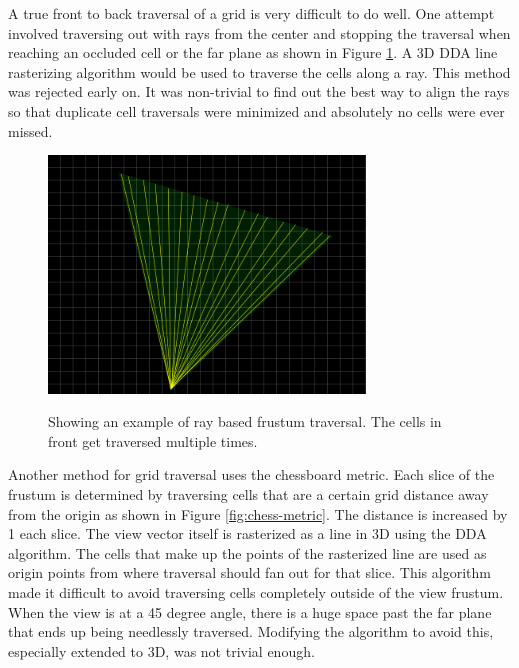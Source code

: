 \documentclass[12pt]{ucthesis}
\newcommand{\captionfonts}{\small\bf\ssp}
\begin{document}
A true front to back traversal of a grid is very difficult to do well.
One attempt involved traversing out with rays from the center and stopping the traversal when reaching an occluded cell or the far plane as shown in Figure \ref{fig:vf-ray-traversal}.
A 3D DDA line rasterizing algorithm would be used to traverse the cells along a ray.\cite{dda-line}
This method was rejected early on.
It was non-trivial to find out the best way to align the rays so that duplicate cell traversals were minimized and absolutely no cells were ever missed.

\begin{figure}
\begin{center}
\includegraphics[width=0.75\textwidth]{Images/rayTraversal.png}
\captionfonts
\caption[Ray Based Traversal]{Showing an example of ray based frustum traversal. The cells in front get traversed multiple times.}
\label{fig:vf-ray-traversal}
\end{center}
\end{figure}

Another method for grid traversal uses the chessboard metric.\cite{chess}
Each slice of the frustum is determined by traversing cells that are a certain grid distance away from the origin as shown in Figure \ref{fig:chess-metric}.
The distance is increased by 1 each slice.
The view vector itself is rasterized as a line in 3D using the DDA algorithm.
The cells that make up the points of the rasterized line are used as origin points from where traversal should fan out for that slice.
This algorithm made it difficult to avoid traversing cells completely outside of the view frustum.
When the view is at a 45 degree angle, there is a huge space past the far plane that ends up being needlessly traversed.
Modifying the algorithm to avoid this, especially extended to 3D, was not trivial enough.
\end{document}
